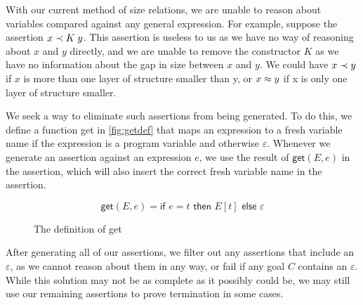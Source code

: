 With our current method of size relations, we are unable to reason about variables
compared against any general expression. For example, suppose the assertion $x \prec K\; y$.
This assertion is useless to us as we have no way of reasoning about $x$ and $y$ directly,
and we are unable to remove the constructor $K$ as we have no information about the
gap in size between $x$ and $y$. We could have $x \prec y$ if $x$ is more than one layer
of structure smaller than y, or $x \approx y$ if x is only one layer of structure smaller.

We seek a way to eliminate such assertions from being generated. To do this,
we define a function \textsf{get} in \autoref{fig:getdef} that maps an expression to
a fresh variable name if the expression is a program variable and otherwise $\varepsilon$.
Whenever we generate an assertion against an expression $e$, we use the result
of $\textsf{get}(E,e)$ in the assertion, which will also insert the correct fresh
variable name in the assertion.

\begin{figure}
    \centering
    \[
        \textsf{get}(E, e) = \textsf{if } e = t \textsf{ then } E[t] \textsf{ else } \varepsilon
    \]
    
    \caption{The definition of \textsf{get}}
    \label{fig:getdef}
\end{figure}

After generating all of our assertions, we filter out any assertions that include an $\varepsilon$,
as we cannot reason about them in any way, or fail if any goal $C$ contains an $\varepsilon$. 
While this solution may not be as complete as it possibly could be, we may still use
our remaining assertions to prove termination in some cases.

